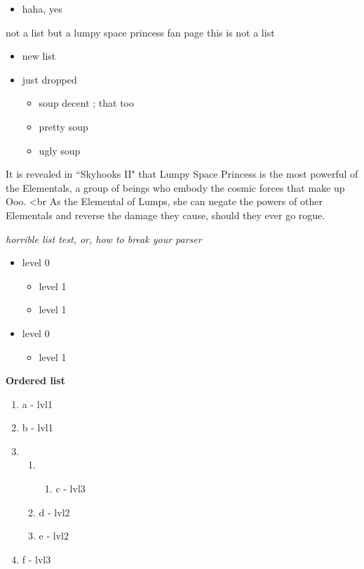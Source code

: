 \begin{itemize}
\item haha, yes 

\end{itemize}

not a list but a lumpy space princess fan page
this is not a list



\begin{itemize}
\item new list
\item just dropped
\begin{itemize} 
 \item soup decent ; that too
\item pretty soup
\item ugly soup 
\end{itemize}

\end{itemize}

It is revealed in ``Skyhooks II" that Lumpy Space Princess is the most powerful of the Elementals, a group of beings who embody the cosmic forces that make up Ooo. <br As the Elemental of Lumps, she can negate the powers of other Elementals and reverse the damage they cause, should they ever go rogue.


\textit{horrible list test, or, how to break your parser}



\begin{itemize}
\item level 0
    \begin{itemize}
        \item level 1
        \item level 1
    \end{itemize}
\item level 0
    \begin{itemize}
        \item level 1
    \end{itemize}
\end{itemize}


\textbf{Ordered list}



\begin{enumerate}
\item a - lvl1 
\item b - lvl1 
\item\begin{enumerate} 
\item\begin{enumerate} 
\item c - lvl3 
\end{enumerate} 
\item d - lvl2 
\item e - lvl2 
\end{enumerate} 
\item f - lvl3 

\end{enumerate}




